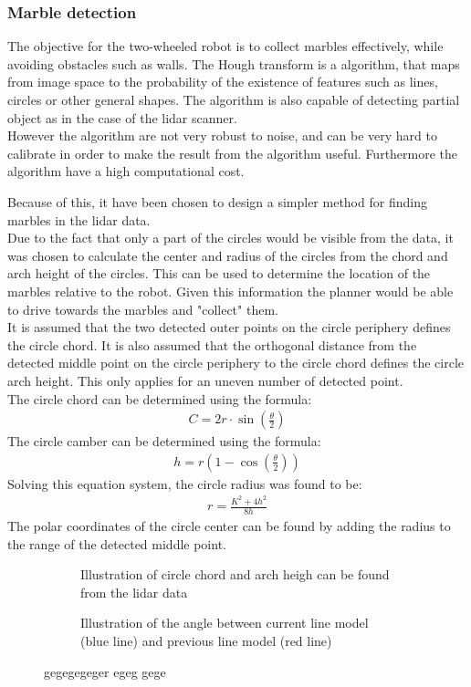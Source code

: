 \documentclass[../Head/Main.tex]{subfiles}
\begin{document}
\subsubsection{Marble detection}
The objective for the two-wheeled robot is to collect marbles effectively, while avoiding obstacles such as walls. 
The Hough transform is a algorithm, that maps from image space to the probability of the existence of features such as lines, circles or other general shapes. The algorithm is also capable of detecting partial object as in the case of the lidar scanner. \\
However the algorithm are not very robust to noise, and can be very hard to calibrate in order to make the result from the algorithm useful. Furthermore the algorithm have a high computational cost.\par 
Because of this, it have been chosen to design a simpler method for finding marbles in the lidar data.\\
Due to the fact that only a part of the circles would be visible from the data, it was chosen to calculate the center and radius of the circles from the chord and arch height of the circles. This can be used to determine the location of the marbles relative to the robot. Given this information the planner would be able to drive towards the marbles and "collect" them. \\
It is assumed that the two detected outer points on the circle periphery defines the circle chord. It is also assumed that the orthogonal distance from the detected middle point on the circle periphery to the circle chord defines the circle arch height. This only applies for an uneven number of detected point.\\
The circle chord can be determined using the formula:
\begin{align*}
	C = 2r\cdot\sin\left(\frac{\theta}{2}\right)
\end{align*}
The circle camber can be determined using the formula:
\begin{align*}
	h = r\left(1-\cos\left(\frac{\theta}{2}\right)\right)
\end{align*}
Solving this equation system, the circle radius was found to be:
\begin{align*}
	r = \frac{K^2+4h^2}{8h}
\end{align*}
The polar coordinates of the circle center can be found by adding the radius to the range of the detected middle point.

\begin{figure}[H]
	\begin{subfigure}[b]{0.49\textwidth}
		\centering
		
		\caption{Illustration of circle chord and arch heigh can be found from the lidar data}
		\label{fig:lidar_marble_detec}
  	\end{subfigure}
  	\hfill
  	\begin{subfigure}[b]{0.49\textwidth}
		\centering
		
		\caption{Illustration of the angle between current line model (blue line) and previous line model (red line)}
		\label{fig:lidar_marble_scaled}
  	\end{subfigure}
  	\caption{gegegegeger egeg gege}
  	\label{fig:lidar_marble}
\end{figure}
\end{document}
